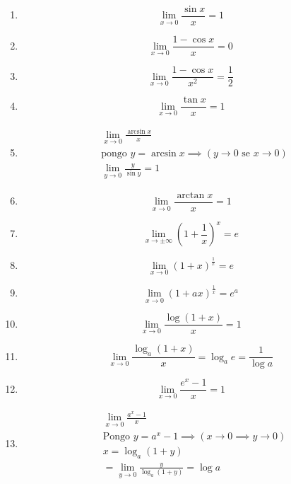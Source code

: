 \begin{enumerate}
    \item \[\lim_{ x \to 0 } \frac{\sin x}{x}=1\]
    
    \item \[\lim_{ x \to 0 } \frac{1- \cos x}{x} = 0\]
    
    \item \[\lim_{ x \to 0 } \frac{1-\cos x}{x^2} = \frac{1}{2}\]
    
    \item \[\lim_{ x \to 0 } \frac{\tan x}{x} = 1\]
    
    \item 
    \begin{align*}
    & \lim_{ x \to 0 } \frac{\arcsin x}{x} \\
    & \text{pongo } y=\arcsin x \implies (y\to 0 \text{ se } x \to 0) \\
    & \lim_{ y \to 0 } \frac{y}{\sin y}= 1 
    \end{align*}
    
    \item \[\lim_{ x \to 0 } \frac{\arctan x}{x}=1\]
    
    \item \[\lim_{ x \to \pm\infty } \left( 1 +\frac{1}{x} \right)^x=e\]
    
    \item \[\lim_{ x \to 0 } (1+x)^{\frac{1}{x}} = e\]
    
    \item \[\lim_{ x \to 0 } (1+ax)^{\frac{1}{x}}=e^a\]
    
    \item \[\lim_{ x \to 0 } \frac{\log(1+x)}{x} = 1\]
    
    \item \[\lim_{ x \to 0 } \frac{\log_{a}{(1+x)}}{x} = \log_{a} e =\frac{1}{\log a}\]
    
    \item \[\lim_{ x \to 0 } \frac{e^x -1}{x} = 1\]
    
    \item 
    \begin{align*}
    &\lim_{ x \to 0 } \frac{a^x-1}{x}\\
    & \text{Pongo } y=a^x-1 \implies (x\to 0 \implies y\to 0) \\
    & x=\log_{a}(1+y) \\
    & = \lim_{ y \to 0 } \frac{y}{\log_{a}(1+y)} = \log a 
    \end{align*}
    

\end{enumerate}
